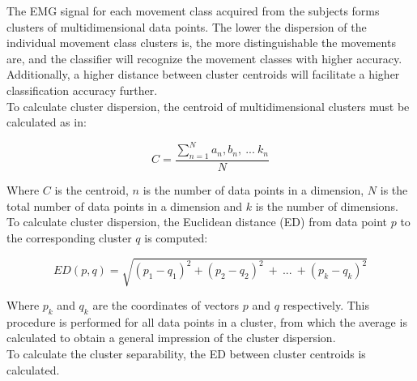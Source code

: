 The EMG signal for each movement class acquired from the subjects forms clusters of multidimensional data points. The lower the dispersion of the individual movement class clusters is, the more distinguishable the movements are, and the classifier will recognize the movement classes with higher accuracy. Additionally, a higher distance between cluster centroids will facilitate a higher classification accuracy further. \\%
To calculate cluster dispersion, the centroid of multidimensional clusters must be calculated as in:

 \begin{equation} \label{eq:centroid}
C = \frac{\sum\limits_{n=1}^{N}a_{n},b_{n},~...~k_{n}}{N}
\end{equation}

Where $C$ is the centroid, $n$ is the number of data points in a dimension, $N$ is the total number of data points in a dimension and $k$ is the number of dimensions. To calculate cluster dispersion, the Euclidean distance (ED) from data point $p$ to the corresponding cluster $q$ is computed: %

\begin{equation} \label{eq:euclidiandistance}
ED(p,q) = \sqrt{(p_1-q_1)^2 + (p_2-q_2)^2~+~...~+ (p_k-q_k)^2}
\end{equation} 

Where $p_k$ and $q_k$ are the coordinates of vectors $p$ and $q$ respectively. This procedure is performed for all data points in a cluster, from which the average is calculated to obtain a general impression of the cluster dispersion.\\
To calculate the cluster separability, the ED between cluster centroids is calculated.  

